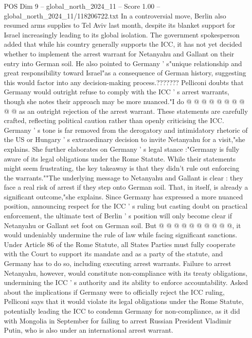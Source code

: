 \begin{textsample}{POS Dim 9 – global\_north\_2024\_11 – Score 1.00 – global\_north\_2024\_11/118206722.txt}
In a controversial move, Berlin also resumed arms supplies to Tel Aviv last month, despite its blanket support for Israel increasingly leading to its global isolation.
The government spokesperson added that while his country generally supports the ICC, it has not yet decided whether to implement the arrest warrant for Netanyahu and Gallant on their entry into German soil.
He also pointed to Germany ' s"unique relationship and great responsibility toward Israel"as a consequence of German history, suggesting this would factor into any decision-making process.???????
Pelliconi doubts that Germany would outright refuse to comply with the ICC ' s arrest warrants, though she notes their approach may be more nuanced."I do @ @ @ @ @ @ @ @ @ @ as an outright rejection of the arrest warrant.
These statements are carefully crafted, reflecting political caution rather than openly criticising the ICC.
Germany ' s tone is far removed from the derogatory and intimidatory rhetoric of the US or Hungary ' s extraordinary decision to invite Netanyahu for a visit,"she explains.
She further elaborates on Germany ' s legal stance :"Germany is fully aware of its legal obligations under the Rome Statute.
While their statements might seem frustrating, the key takeaway is that they didn't rule out enforcing the warrants.""The underlying message to Netanyahu and Gallant is clear : they face a real risk of arrest if they step onto German soil.
That, in itself, is already a significant outcome,"she explains.
Since Germany has expressed a more nuanced position, announcing respect for the ICC ' s ruling but casting doubt on practical enforcement, the ultimate test of Berlin ' s position will only become clear if Netanyahu or Gallant set foot on German soil.
But @ @ @ @ @ @ @ @ @ @, it would undeniably undermine the rule of law while facing significant sanctions.
Under Article 86 of the Rome Statute, all States Parties must fully cooperate with the Court to support its mandate and as a party of the statute, and Germany has to do so, including executing arrest warrants.
Failure to arrest Netanyahu, however, would constitute non-compliance with its treaty obligations, undermining the ICC ' s authority and its ability to enforce accountability.
Asked about the implications if Germany were to officially reject the ICC ruling, Pelliconi says that it would violate its legal obligations under the Rome Statute, potentially leading the ICC to condemn Germany for non-compliance, as it did with Mongolia in September for failing to arrest Russian President Vladimir Putin, who is also under an international arrest warrant.

\end{textsample}

